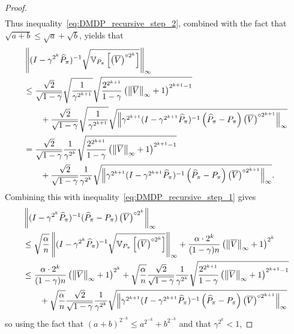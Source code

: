 \documentclass{article}
\theoremstyle{plain}
\theoremstyle{plain}
\theoremstyle{remark}
\theoremstyle{plain}
\theoremstyle{plain}
\newcommand{\Var}{\mathbb{V}}
\newcommand{\Phat}{\widehat{P}}
\newcommand{\Vc}{\overline{V}}
\begin{document}
\begin{proof}
\begin{align*}
\end{align*}
Thus inequality~\eqref{eq:DMDP_recursive_step_2}, combined with the fact that $\sqrt{a+b} \leq \sqrt{a} + \sqrt{b}$, yields that
\begin{align}
    &\infnorm{(I - \gamma^{2^k} \Phat_{\pi})^{-1} \sqrt{\Var_{P_{\pi}} \left[ \left(\Vc \right)^{\circ 2^k}  \right] } } \\
    & \leq \frac{\sqrt{2}}{\sqrt{1-\gamma}} \sqrt{\frac{1}{\gamma^{2^{k+1}}}} \sqrt{\frac{2^{2^{k+1}}}{1-\gamma} \left(\infnorm{\Vc} + 1 \right)^{2^{k+1}-1} }  \nonumber \\
    & \quad \quad + \frac{\sqrt{2}}{\sqrt{1-\gamma}} \sqrt{\frac{1}{\gamma^{2^{k+1}}}} \sqrt{\infnorm{\gamma^{2^{k+1}}(I - \gamma^{2^{k+1}} \Phat_{\pi})^{-1}\left(\Phat_\pi - P_\pi \right) \left(\Vc \right)^{\circ 2^{k+1}}}} \\
    & = \frac{\sqrt{2}}{\sqrt{1-\gamma}} \frac{1}{\gamma^{2^k}} \sqrt{\frac{2^{2^{k+1}}}{1-\gamma} \left(\infnorm{\Vc} + 1 \right)^{2^{k+1}-1} }  \nonumber \\
    & \quad \quad + \frac{\sqrt{2}}{\sqrt{1-\gamma}}\frac{1}{\gamma^{2^k}} \sqrt{\infnorm{\gamma^{2^{k+1}}(I - \gamma^{2^{k+1}} \Phat_{\pi})^{-1}\left(\Phat_\pi - P_\pi \right) \left(\Vc \right)^{\circ 2^{k+1}}}}.
\end{align}
Combining this with inequality~\eqref{eq:DMDP_recursive_step_1} gives
\begin{align*}
         &\infnorm{ (I - \gamma^{2^k} \Phat_{\pi})^{-1} (\Phat_{\pi} - P_\pi) \left( \Vc \right)^{\circ 2^k} }\\
         & \leq \sqrt{\frac{\alpha}{n}} \infnorm{(I - \gamma^{2^k} \Phat_{\pi})^{-1} \sqrt{\Var_{P_{\pi}} \left[ \left(\Vc \right)^{\circ 2^k}  \right] }} + \frac{ \alpha \cdot 2^k }{(1-\gamma) n}  \left( \infnorm{\Vc} + 1\right)^{2^k} \\
         & \leq \frac{ \alpha \cdot 2^k }{(1-\gamma) n}  \left( \infnorm{\Vc} + 1\right)^{2^k} + \sqrt{\frac{\alpha}{n}}\frac{\sqrt{2}}{\sqrt{1-\gamma}} \frac{1}{\gamma^{2^k}} \sqrt{\frac{2^{2^{k+1}}}{1-\gamma} \left(\infnorm{\Vc} + 1 \right)^{2^{k+1}-1} }  \nonumber \\
    & \quad \quad +  \sqrt{\frac{\alpha}{n}} \frac{\sqrt{2}}{\sqrt{1-\gamma}} \frac{1}{\gamma^{2^k}} \sqrt{\infnorm{\gamma^{2^{k+1}}(I - \gamma^{2^{k+1}} \Phat_{\pi})^{-1}\left(\Phat_\pi - P_\pi \right) \left(\Vc \right)^{\circ 2^{k+1}}}}
    \end{align*}
so using the fact that $(a+b)^{2^{-k}} \leq a^{2^{-k}} + b^{2^{-k}}$ and that $\gamma^{2^k} < 1$,

\end{proof}
\end{document}
